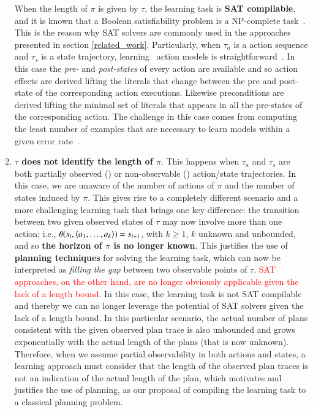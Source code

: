 \begin{enumerate}
    When the length of $\pi$ is given by $\tau$, the learning task is \textbf{SAT compilable}, and it is known that a Boolean satisfiability problem is a NP-complete task~\cite{cook1971complexity}. This is the reason why SAT solvers are commonly used in the approaches presented in section \ref{related_work}. Particularly, when $\tau_a$ is a \FO action sequence and $\tau_s$ is a \FO state trajectory, learning \strips\ action models is straightforward~\cite{jimenez2012review}. In this case the {\em pre-} and {\em post-states} of every action are available and so action effects are derived lifting the literals that change between the pre and post-state of the corresponding action executions. Likewise preconditions are derived lifting the minimal set of literals that appears in all the pre-states of the corresponding action. The challenge in this case comes from computing the least number of examples that are necessary to learn models within a given error rate~\cite{SternJ17}.


\item \textbf{$\tau$ does not identify the length of $\pi$}. This happens when $\tau_a$ and $\tau_s$ are both partially observed (\PO) or non-observable (\NO) action/state trajectories. In this case, we are unaware of the number of actions of $\pi$ and the number of states induced by $\pi$. This gives rise to a completely different scenario and a more challenging learning task that brings one key difference: the transition between two given observed states of $\tau$ may now involve more than one action; i.e., $\theta(s_i,{\langle a_1,\ldots,a_k \rangle})=s_{i+1}$, with $k \geq 1$, $k$ unknown and unbounded, and so \textbf{the horizon of $\pi$ is no longer known}. This justifies the use of \textbf{planning techniques} for solving the learning task, which can now be interpreted as \emph{filling the gap} between two observable points of $\tau$. \textcolor{red}{SAT approaches, on the other hand, are no longer obviously applicable given the lack of a length bound}. \textcolor[rgb]{0.00,0.00,1.00}{In this case, the learning task is not SAT compilable and thereby we can no longer leverage the potential of SAT solvers given the lack of a length bound.} In this particular scenario, the actual number of plans consistent with the given observed plan trace is also unbounded and grows exponentially with the actual length of the plans (that is now unknown). Therefore, when we assume partial observability in both actions and states, a learning approach must consider that the length of the observed plan traces is not an indication of the actual length of the plan, which motivates and justifies the use of planning, as our proposal of compiling the learning task to a classical planning problem.


\end{enumerate}
